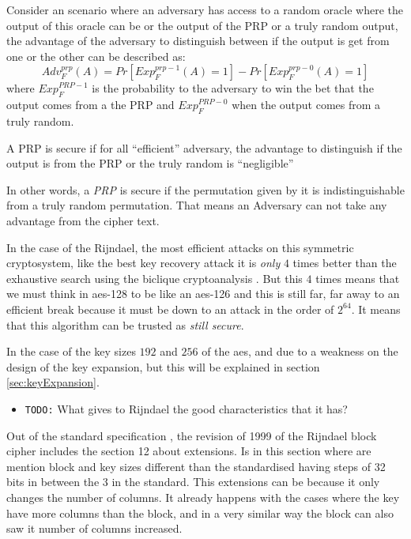 \documentclass[10pt,a4paper,twoside]{llncs}
\begin{document}
Consider an scenario where an adversary has access to a random oracle where the output of this oracle can be or the output of the PRP or a truly random output, the advantage of the adversary to distinguish between if the output is get from one or the other can be described as:
\begin{equation}\label{eq:prpAdv}
 {Adv}_{F}^{prp}(A) = Pr[{Exp}_{F}^{prp-1}(A)=1]-Pr[{Exp}_{F}^{prp-0}(A)=1]
\end{equation}
where ${Exp}_{F}^{PRP-1}$ is the probability to the adversary to win the bet that the output comes from a the PRP and ${Exp}_{F}^{PRP-0}$ when the output comes from a truly random.

\begin{definition}\label{def:securePRP}
 A PRP is secure if for all ``efficient'' adversary, the advantage to distinguish if the output is from the PRP or the truly random is ``negligible''
\end{definition}

In other words, a \emph{PRP} is secure if the permutation given by it is indistinguishable from a truly random permutation. That means an Adversary can not take any advantage from the cipher text.

In the case of the Rijndael, the most efficient attacks on this symmetric cryptosystem, like the best key recovery attack it is \emph{only} $4$ times better than the exhaustive search using the biclique cryptoanalysis \cite{biclique-fullaes}. But this $4$ times means that we must think in aes-128 to be like an aes-126 and this is still far, far away to an efficient break because it must be down to an attack in the order of $2^{64}$. It means that this algorithm can be trusted as \emph{still secure}.

In the case of the key sizes $192$ and $256$ of the aes, and due to a weakness on the design of the key expansion, but this will be explained in section \ref{sec:keyExpansion}.

\begin{itemize}
 \item \texttt{TODO:} What gives to Rijndael the good characteristics that it has?
\end{itemize}

Out of the standard specification \cite{AES-FIPS}, the revision of 1999 of the Rijndael block cipher \cite{Daemen01aes-ammended} includes the section 12 about extensions. Is in this section where are mention block and key sizes different than the standardised having steps of 32 bits in between the 3 in the standard. This extensions can be because it only changes the number of columns. It already happens with the cases where the key have more columns than the block, and in a very similar way the block can also saw it number of columns increased.
\end{document}
